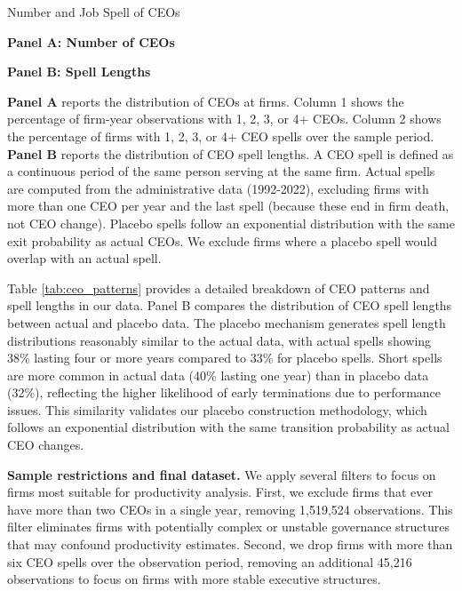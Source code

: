 \documentclass[11pt,a4paper]{article}
\begin{document}
\begin{table}[htbp]
\centering
\caption{Number and Job Spell of CEOs}
\label{tab:ceo_patterns}
\begin{minipage}{0.48\textwidth}
\centering
\textbf{Panel A: Number of CEOs}

\end{minipage}
\hfill
\begin{minipage}{0.48\textwidth}
\centering
\textbf{Panel B: Spell Lengths}

\end{minipage}
\begin{tablenotes}[flushleft]
\footnotesize
\item\textbf{Panel A} reports the distribution of CEOs at firms. Column 1 shows the percentage of firm-year observations with 1, 2, 3, or 4+ CEOs. Column 2 shows the percentage of firms with 1, 2, 3, or 4+ CEO spells over the sample period. \textbf{Panel B} reports the distribution of CEO spell lengths. A CEO spell is defined as a continuous period of the same person serving at the same firm.
Actual spells are computed from the administrative data (1992-2022), excluding firms with more than one CEO per year and the last spell (because these end in firm death, not CEO change). Placebo spells follow an exponential distribution with the same exit probability as actual CEOs. We exclude firms where a placebo spell would overlap with an actual spell.
\end{tablenotes}
\end{table}

Table \ref{tab:ceo_patterns} provides a detailed breakdown of CEO patterns and spell lengths in our data. Panel B compares the distribution of CEO spell lengths between actual and placebo data. The placebo mechanism generates spell length distributions reasonably similar to the actual data, with actual spells showing 38\% lasting four or more years compared to 33\% for placebo spells. Short spells are more common in actual data (40\% lasting one year) than in placebo data (32\%), reflecting the higher likelihood of early terminations due to performance issues. This similarity validates our placebo construction methodology, which follows an exponential distribution with the same transition probability as actual CEO changes.

\textbf{Sample restrictions and final dataset.} We apply several filters to focus on firms most suitable for productivity analysis. First, we exclude firms that ever have more than two CEOs in a single year, removing 1,519,524 observations. This filter eliminates firms with potentially complex or unstable governance structures that may confound productivity estimates. Second, we drop firms with more than six CEO spells over the observation period, removing an additional 45,216 observations to focus on firms with more stable executive structures.
\end{document}
